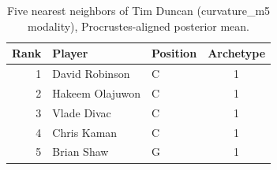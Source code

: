 \begin{table}[htbp]
  \centering\small
  \begin{tabular}{rllc}
    \toprule
    Rank & Player & Position & Archetype \\
    \midrule
    1 & David Robinson & C & 1 \\
    2 & Hakeem Olajuwon & C & 1 \\
    3 & Vlade Divac & C & 1 \\
    4 & Chris Kaman & C & 1 \\
    5 & Brian Shaw & G & 1 \\
    \bottomrule
  \end{tabular}
  \caption{Five nearest neighbors of Tim Duncan (curvature_m5 modality), Procrustes-aligned posterior mean.}
  \label{tab:Tim_Duncan_neighbors_curvature_m5}
\end{table}


